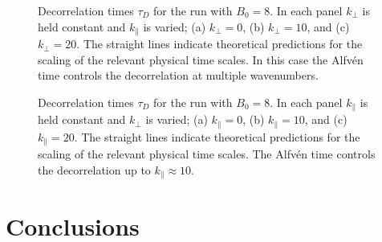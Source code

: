 \begin{figure}
  \centering


  \caption{Decorrelation times $\tau_D$ for the run with $B_0=8$. In each
    panel $k_\perp$ is held constant and $k_\parallel$ is varied; (a)
    $k_\perp=0$, (b) $k_\perp = 10$, and (c) $k_\perp = 20$. The
    straight lines indicate theoretical predictions for
    the scaling of the relevant physical time scales. In this case the
    Alfv\'en time controls the decorrelation at multiple wavenumbers.}
  \label{fig5:B8_bvf_b_kperp}
\end{figure}

\begin{figure}
  \centering


  \caption{Decorrelation times $\tau_D$ for the run with $B_0=8$. In each
    panel $k_\parallel$ is held constant and $k_\perp$ is varied; (a)
    $k_\parallel = 0$, (b) $k_\parallel = 10$, and (c) $k_\parallel =
    20$. The straight lines indicate theoretical predictions for
    the scaling of the relevant physical time scales. The Alfv\'en
    time controls the decorrelation up to $k_\parallel \approx 10$.}
  \label{fig5:B8_bvf_b_kpara}
\end{figure}


\section{Conclusions}\label{sec_Conclusions}

